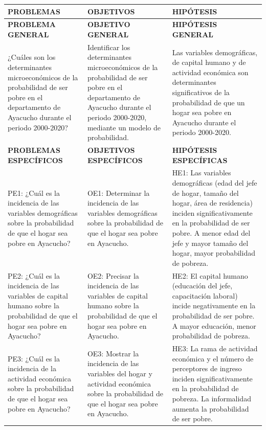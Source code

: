 \documentclass[
  man,
  floatsintext,
  longtable,
  a4paper,
  nolmodern,
  notxfonts,
  notimes,
  12pt,
  colorlinks=true,linkcolor=blue,citecolor=blue,urlcolor=blue]{apa7}
\newcounter{none} %
\begin{document}
{\def\LTcaptype{none} %
\begin{longtable}[]{@{}
  >{\raggedright\arraybackslash}p{}
  >{\raggedright\arraybackslash}p{}
  >{\raggedright\arraybackslash}p{}@{}}
\toprule\noalign{}
\begin{minipage}[b]{\linewidth}\raggedright
PROBLEMAS
\end{minipage} & \begin{minipage}[b]{\linewidth}\raggedright
OBJETIVOS
\end{minipage} & \begin{minipage}[b]{\linewidth}\raggedright
HIPÓTESIS
\end{minipage} \\
\midrule\noalign{}
\endhead
\bottomrule\noalign{}
\endlastfoot
\textbf{PROBLEMA GENERAL} & \textbf{OBJETIVO GENERAL} &
\textbf{HIPÓTESIS GENERAL} \\
¿Cuáles son los determinantes microeconómicos de la probabilidad de ser
pobre en el departamento de Ayacucho durante el periodo 2000-2020? &
Identificar los determinantes microeconómicos de la probabilidad de ser
pobre en el departamento de Ayacucho durante el periodo 2000-2020,
mediante un modelo de probabilidad. & Las variables demográficas, de
capital humano y de actividad económica son determinantes significativos
de la probabilidad de que un hogar sea pobre en Ayacucho durante el
periodo 2000-2020. \\
\textbf{PROBLEMAS ESPECÍFICOS} & \textbf{OBJETIVOS ESPECÍFICOS} &
\textbf{HIPÓTESIS ESPECÍFICAS} \\
PE1: ¿Cuál es la incidencia de las variables demográficas sobre la
probabilidad de que el hogar sea pobre en Ayacucho? & OE1: Determinar la
incidencia de las variables demográficas sobre la probabilidad de que el
hogar sea pobre en Ayacucho. & HE1: Las variables demográficas (edad del
jefe de hogar, tamaño del hogar, área de residencia) inciden
significativamente en la probabilidad de ser pobre. A menor edad del
jefe y mayor tamaño del hogar, mayor probabilidad de pobreza. \\
PE2: ¿Cuál es la incidencia de las variables de capital humano sobre la
probabilidad de que el hogar sea pobre en Ayacucho? & OE2: Precisar la
incidencia de las variables de capital humano sobre la probabilidad de
que el hogar sea pobre en Ayacucho. & HE2: El capital humano (educación
del jefe, capacitación laboral) incide negativamente en la probabilidad
de ser pobre. A mayor educación, menor probabilidad de pobreza. \\
PE3: ¿Cuál es la incidencia de la actividad económica sobre la
probabilidad de que el hogar sea pobre en Ayacucho? & OE3: Mostrar la
incidencia de las variables del hogar y actividad económica sobre la
probabilidad de que el hogar sea pobre en Ayacucho. & HE3: La rama de
actividad económica y el número de perceptores de ingreso inciden
significativamente en la probabilidad de pobreza. La informalidad
aumenta la probabilidad de ser pobre. \\
\end{longtable}
}
\end{document}
